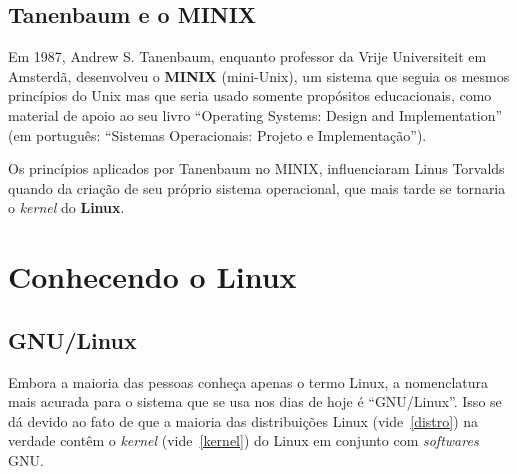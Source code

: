 \documentclass{handout_utfpr}
\begin{document}
\subsection{Tanenbaum e o MINIX}
Em 1987, Andrew S. Tanenbaum, enquanto professor da Vrije Universiteit em Amsterdã, desenvolveu o \textbf{MINIX} (mini-Unix), um sistema que seguia os mesmos princípios do Unix mas que seria usado somente propósitos educacionais, como material de apoio ao seu livro ``Operating Systems: Design and Implementation'' (em português: ``Sistemas Operacionais: Projeto e Implementação'').

Os princípios aplicados por Tanenbaum no MINIX, influenciaram Linus Torvalds quando da criação de seu próprio sistema operacional, que mais tarde se tornaria o \textit{kernel} do \textbf{Linux}.






\section{Conhecendo o Linux}

\subsection{GNU/Linux}
Embora a maioria das pessoas conheça apenas o termo Linux, a nomenclatura mais acurada para o sistema que se usa nos dias de hoje é ``GNU/Linux''. Isso se dá devido ao fato de que a maioria das distribuições Linux (vide~\ref{distro}) na verdade contêm o \textit{kernel} (vide~\ref{kernel}) do Linux em conjunto com \textit{softwares} GNU.
\end{document}
